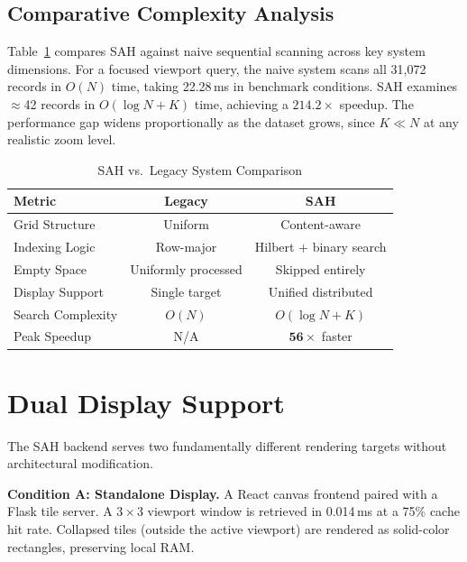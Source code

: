 \documentclass[conference]{IEEEtran}
\begin{document}
\subsection{Comparative Complexity Analysis}

Table~\ref{tab:compare} compares SAH against naive sequential scanning across key system dimensions. For a focused viewport query, the naive system scans all 31{,}072 records in $O(N)$ time, taking 22.28\,ms in benchmark conditions. SAH examines $\approx$42 records in $O(\log N + K)$ time, achieving a $214.2\times$ speedup. The performance gap widens proportionally as the dataset grows, since $K \ll N$ at any realistic zoom level.

\begin{table}[t]
  \caption{SAH vs.\ Legacy System Comparison}
  \label{tab:compare}
  \centering
  \scriptsize
  \renewcommand{\arraystretch}{1.1}
  \setlength{\tabcolsep}{3pt}
  \begin{tabular}{l c c}
    \toprule
    \textbf{Metric} & \textbf{Legacy} & \textbf{SAH} \\
    \midrule
    Grid Structure & Uniform & Content-aware \\
    Indexing Logic & Row-major & Hilbert + binary search \\
    Empty Space & Uniformly processed & Skipped entirely \\
    Display Support & Single target & Unified distributed \\
    Search Complexity & $O(N)$ & $O(\log N + K)$ \\
    Peak Speedup & N/A & $\mathbf{56\times}$ faster \\
    \bottomrule
  \end{tabular}
\end{table}

\section{Dual Display Support}

The SAH backend serves two fundamentally different rendering targets without architectural modification.

\textbf{Condition A: Standalone Display.} A React canvas frontend paired
with a Flask tile server. A $3\times3$ viewport window is retrieved in 0.014\,ms at a 75\% cache hit rate. Collapsed tiles (outside the active viewport) are rendered as solid-color rectangles, preserving local RAM.
\end{document}
